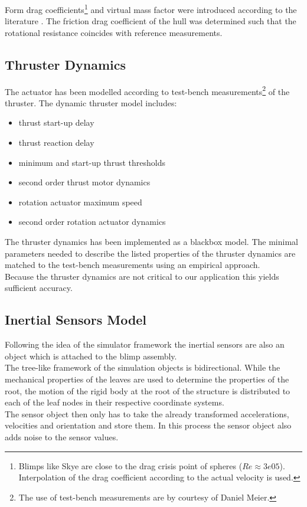 Form drag coefficients\footnote{
Blimps like Skye are close to the drag crisis point of spheres ($Re\approx3e05$). Interpolation of the drag coefficient according to the actual velocity is used.}
and virtual mass factor were introduced according to the literature \citep{Kundu2012}.
The friction drag coefficient of the hull was determined such that the rotational resistance coincides with reference measurements.

\subsection{Thruster Dynamics}
\label{sub:thrust_dynamics}
The actuator has been modelled according to test-bench measurements\footnote{The use of test-bench measurements are by courtesy of Daniel Meier.} of the thruster.
The dynamic thruster model includes:
\begin{itemize}
\item thrust start-up delay
\item thrust reaction delay
\item minimum and start-up thrust thresholds
\item second order thrust motor dynamics
\item rotation actuator maximum speed
\item second order rotation actuator dynamics
\end{itemize}
The thruster dynamics has been implemented as a blackbox model.
The minimal parameters needed to describe the listed properties of the thruster dynamics are matched to the test-bench measurements using an empirical approach.  \\
Because the thruster dynamics are not critical to our application this yields sufficient accuracy.

\subsection{Inertial Sensors Model}
\label{sub:imu_model}
Following the idea of the simulator framework the inertial sensors are also an object which is attached to the blimp assembly. \\
The tree-like framework of the simulation objects is bidirectional.
While the mechanical properties of the leaves are used to determine the properties of the root,
the motion of the rigid body at the root of the structure is distributed to each of the leaf nodes in their respective coordinate systems. \\
The sensor object then only has to take the already transformed accelerations, velocities and orientation and store them.
In this process the sensor object also adds noise to the sensor values.

